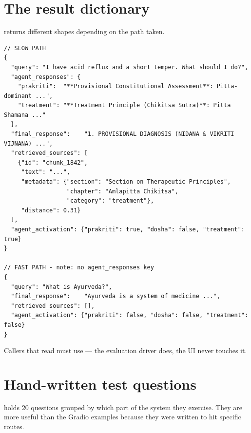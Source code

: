 \section{The result dictionary}

 returns different shapes depending on the path taken.

\begin{lstlisting}[style=json]
// SLOW PATH
{
  "query": "I have acid reflux and a short temper. What should I do?",
  "agent_responses": {
    "prakriti":  "**Provisional Constitutional Assessment**: Pitta-dominant ...",
    "treatment": "**Treatment Principle (Chikitsa Sutra)**: Pitta Shamana ..."
  },
  "final_response":    "1. PROVISIONAL DIAGNOSIS (NIDANA & VIKRITI VIJNANA) ...",
  "retrieved_sources": [
    {"id": "chunk_1842",
     "text": "...",
     "metadata": {"section": "Section on Therapeutic Principles",
                  "chapter": "Amlapitta Chikitsa",
                  "category": "treatment"},
     "distance": 0.31}
  ],
  "agent_activation": {"prakriti": true, "dosha": false, "treatment": true}
}

// FAST PATH - note: no agent_responses key
{
  "query": "What is Ayurveda?",
  "final_response":    "Ayurveda is a system of medicine ...",
  "retrieved_sources": [],
  "agent_activation": {"prakriti": false, "dosha": false, "treatment": false}
}
\end{lstlisting}

Callers that read  must use  --- the evaluation driver does, the UI never touches it.

\section{Hand-written test questions}

 holds 20 questions grouped by which part of the system they exercise. They are more useful than the Gradio examples because they were written to hit specific routes.

